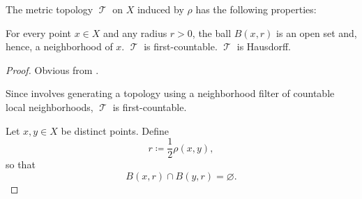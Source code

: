 \begin{proposition}\label{thm:def:metric_topology}
  The metric topology \( \mscrT \) on \( X \) induced by \( \rho \) has the following properties:
  \begin{thmenum}
     For every point \( x \in X \) and any radius \( r > 0 \), the ball \( B(x, r) \) is an open set and, hence, a neighborhood of \( x \).
     \( \mscrT \) is first-countable.
     \( \mscrT \) is Hausdorff.
  \end{thmenum}
\end{proposition}
\begin{proof}
   Obvious from .

   Since  involves generating a topology using a neighborhood filter of countable local neighborhoods, \( \mscrT \) is first-countable.

   Let \( x, y \in X \) be distinct points. Define
  \begin{equation*}
    r \coloneqq \dfrac 1 2 \rho(x, y),
  \end{equation*}
  so that
  \begin{equation*}
    B(x, r) \cap B(y, r) = \varnothing.
  \end{equation*}
\end{proof}

